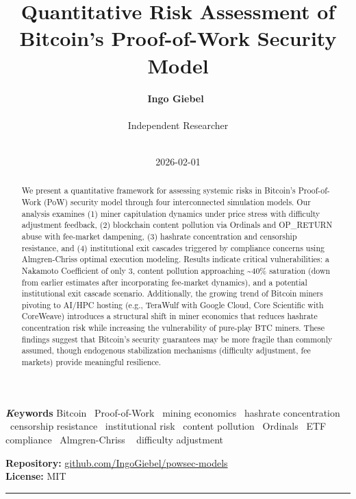 \documentclass[
  11pt,
]{article}
\title{Quantitative Risk Assessment of Bitcoin's Proof-of-Work Security
Model}
\author{\textbf{Ingo
Giebel}~\orcidlink{0009-0005-4238-000X}\\\\Independent Researcher\\\\}
\date{2026-02-01}
\begin{document}
\maketitle
\begin{abstract}
We present a quantitative framework for assessing systemic risks in
Bitcoin's Proof-of-Work (PoW) security model through four interconnected
simulation models. Our analysis examines (1) miner capitulation dynamics
under price stress with difficulty adjustment feedback, (2) blockchain
content pollution via Ordinals and OP\_RETURN abuse with fee-market
dampening, (3) hashrate concentration and censorship resistance, and (4)
institutional exit cascades triggered by compliance concerns using
Almgren-Chriss optimal execution modeling. Results indicate critical
vulnerabilities: a Nakamoto Coefficient of only 3, content pollution
approaching \textasciitilde40\% saturation (down from earlier estimates
after incorporating fee-market dynamics), and a potential institutional
exit cascade scenario. Additionally, the growing trend of Bitcoin miners
pivoting to AI/HPC hosting (e.g., TeraWulf with Google Cloud, Core
Scientific with CoreWeave) introduces a structural shift in miner
economics that reduces hashrate concentration risk while increasing the
vulnerability of pure-play BTC miners. These findings suggest that
Bitcoin's security guarantees may be more fragile than commonly assumed,
though endogenous stabilization mechanisms (difficulty adjustment, fee
markets) provide meaningful resilience.
\end{abstract}
{\bfseries \emph Keywords}
\def\sep{\textbullet\ }
Bitcoin \sep Proof-of-Work \sep mining economics \sep hashrate
concentration \sep censorship resistance \sep institutional
risk \sep content pollution \sep Ordinals \sep ETF
compliance \sep Almgren-Chriss \sep 
difficulty adjustment

\ifdefined\Shaded\renewenvironment{Shaded}{\begin{tcolorbox}[borderline west={3pt}{0pt}{shadecolor}, interior hidden, frame hidden, sharp corners, enhanced, boxrule=0pt, breakable]}{\end{tcolorbox}}\fi

\textbf{Repository:}
\href{https://github.com/IngoGiebel/powsec-models}{github.com/IngoGiebel/powsec-models}\\
\textbf{License:} MIT

\begin{center}\rule{0.5\linewidth}{0.5pt}\end{center}
\end{document}
